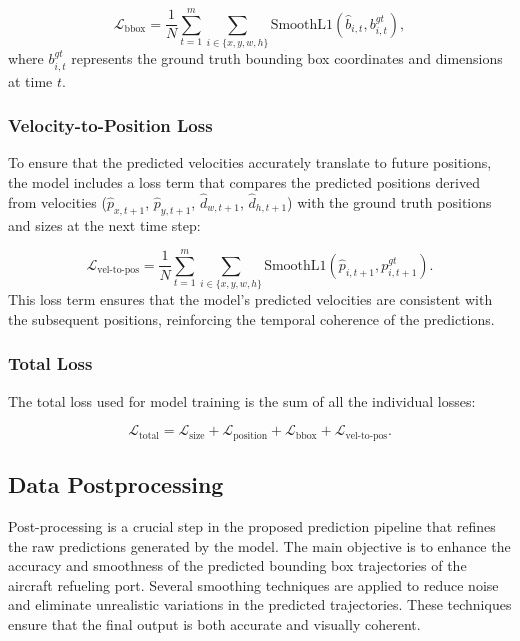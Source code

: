 \documentclass[12pt,oneside]{book} %
\begin{document}
\begin{equation}
    \mathcal{L}_{\text{bbox}} = \frac{1}{N} \sum_{t=1}^{m} \sum_{i \in \{x, y, w, h\}} \text{SmoothL1}\left(\hat{b}_{i,t}, b^{gt}_{i,t}\right),
\end{equation}
where \(b^{gt}_{i,t}\) represents the ground truth bounding box coordinates and
dimensions at time \(t\).

\subsubsection*{Velocity-to-Position Loss}
\noindent To ensure that the predicted velocities accurately translate to future positions, the model includes a loss term that compares the predicted positions derived from velocities (\(\hat{p}_{x,t+1}\), \(\hat{p}_{y,t+1}\), \(\hat{d}_{w,t+1}\), \(\hat{d}_{h,t+1}\)) with the ground truth positions and sizes at the next time step:

\begin{equation}
    \mathcal{L}_{\text{vel-to-pos}} = \frac{1}{N} \sum_{t=1}^{m} \sum_{i \in \{x, y, w, h\}} \text{SmoothL1}\left(\hat{p}_{i,t+1}, p^{gt}_{i,t+1}\right).
\end{equation}
This loss term ensures that the model's predicted velocities are consistent
with the subsequent positions, reinforcing the temporal coherence of the
predictions.

\subsubsection*{Total Loss}
\noindent The total loss used for model training is the sum of all the individual losses:

\begin{equation}
    \mathcal{L}_{\text{total}} = \mathcal{L}_{\text{size}} + \mathcal{L}_{\text{position}} + \mathcal{L}_{\text{bbox}} + \mathcal{L}_{\text{vel-to-pos}}.
\end{equation}

\subsection{Data Postprocessing}
Post-processing is a crucial step in the proposed prediction pipeline that
refines the raw predictions generated by the model. The main objective is to
enhance the accuracy and smoothness of the predicted bounding box trajectories
of the aircraft refueling port. Several smoothing techniques are applied to
reduce noise and eliminate unrealistic variations in the predicted
trajectories. These techniques ensure that the final output is both accurate
and visually coherent. 
\end{document}
